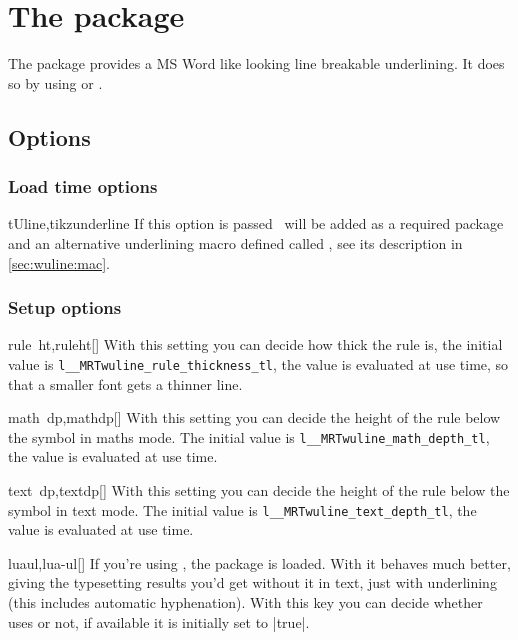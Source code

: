\chapter{The  package}
The package provides a MS Word like looking line breakable underlining. It does
so by using  or .

\section{Options}
\subsection{Load time options}\label{sec:wuline:options:loadtime}%
\begin{describeopt}{tUline,tikzunderline}
  If this option is passed \TikZ\ will be added as a required package and an
  alternative underlining macro defined called , see its description
  in \autoref{sec:wuline:mac}.
\end{describeopt}

\subsection{Setup options}%
\begin{describeopt}{rule~ht,ruleht}[]
  With this setting you can decide how thick the rule is, the initial value is
  \texttt{\csname l__MRTwuline_rule_thickness_tl\endcsname}, the value is
  evaluated at use time, so that a smaller font gets a thinner line.
\end{describeopt}

\begin{describeopt}{math~dp,mathdp}[]
  With this setting you can decide the height of the rule below the symbol in
  maths mode. The initial value is
  \texttt{\csname l__MRTwuline_math_depth_tl\endcsname}, the value is evaluated
  at use time.
\end{describeopt}

\begin{describeopt}{text~dp,textdp}[]
  With this setting you can decide the height of the rule below the symbol in
  text mode. The initial value is
  \texttt{\csname l__MRTwuline_text_depth_tl\endcsname}, the value is evaluated
  at use time.
\end{describeopt}

\begin{describeopt}{luaul,lua-ul}[]
  If you're using , the  package is loaded. With it
   behaves much better, giving the typesetting results you'd get
  without it in text, just with underlining (this includes automatic
  hyphenation). With this key you can decide whether  uses
   or not, if available it is initially set to |true|.
\end{describeopt}

